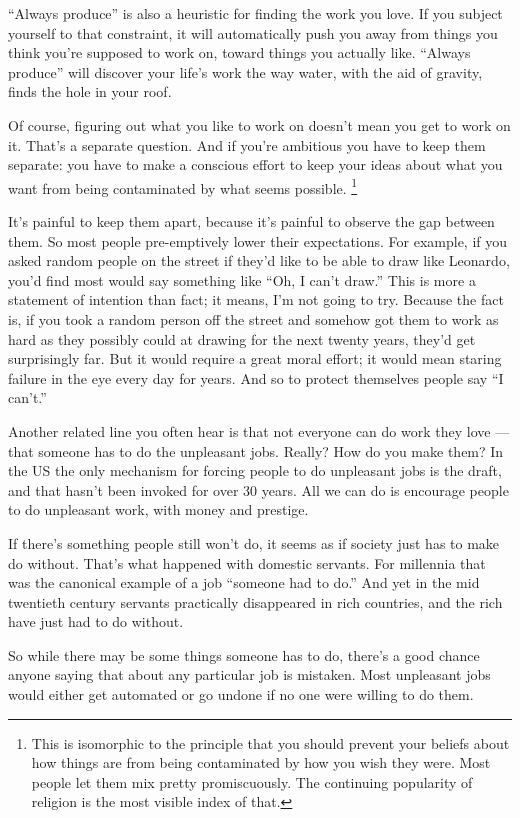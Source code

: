 ``Always produce'' is also a heuristic for finding the work you love. If
you subject yourself to that constraint, it will automatically push you
away from things you think you're supposed to work on, toward things you
actually like. ``Always produce'' will discover your life's work the way
water, with the aid of gravity, finds the hole in your roof.

Of course, figuring out what you like to work on doesn't mean you get to
work on it. That's a separate question. And if you're ambitious you have
to keep them separate: you have to make a conscious effort to keep your
ideas about what you want from being contaminated by what seems
possible. \footnote{This is isomorphic to the principle that you should prevent your
beliefs about how things are from being contaminated by how you wish
they were. Most people let them mix pretty promiscuously. The continuing
popularity of religion is the most visible index of that.}

It's painful to keep them apart, because it's painful to observe the gap
between them. So most people pre-emptively lower their expectations. For
example, if you asked random people on the street if they'd like to be
able to draw like Leonardo, you'd find most would say something like
``Oh, I can't draw.'' This is more a statement of intention than fact;
it means, I'm not going to try. Because the fact is, if you took a
random person off the street and somehow got them to work as hard as
they possibly could at drawing for the next twenty years, they'd get
surprisingly far. But it would require a great moral effort; it would
mean staring failure in the eye every day for years. And so to protect
themselves people say ``I can't.''

Another related line you often hear is that not everyone can do work
they love --- that someone has to do the unpleasant jobs. Really? How do
you make them? In the US the only mechanism for forcing people to do
unpleasant jobs is the draft, and that hasn't been invoked for over 30
years. All we can do is encourage people to do unpleasant work, with
money and prestige.

If there's something people still won't do, it seems as if society just
has to make do without. That's what happened with domestic servants. For
millennia that was the canonical example of a job ``someone had to do.''
And yet in the mid twentieth century servants practically disappeared in
rich countries, and the rich have just had to do without.

So while there may be some things someone has to do, there's a good
chance anyone saying that about any particular job is mistaken. Most
unpleasant jobs would either get automated or go undone if no one were
willing to do them.

